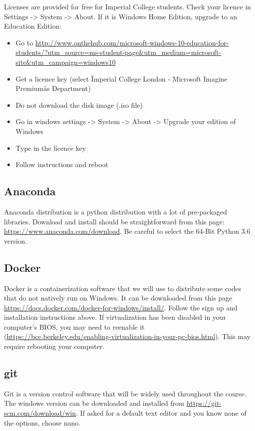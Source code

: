 \documentclass[11pt]{article}
\begin{document}
Licenses are provided for free for Imperial College students. Check your licence in Settings -> System -> About. If it is Windows Home Edition, upgrade to an Education Edition:
\begin{itemize}
  \item Go to \url{http://www.onthehub.com/microsoft-windows-10-education-for-students/?utm_source=ms-student-page&utm_medium=microsoft-site&utm_campaign=windows10}
  \item Get a licence key (select \"Imperial College London - Microsoft Imagine Premium\" as Department)
  \item Do not download the disk image (.iso file)
  \item Go in windows settings -> System -> About -> Upgrade your edition of Windows
  \item Type in the licence key
  \item Follow instructions and reboot
\end{itemize}

\subsection{Anaconda}

Anaconda distribution is a python distribution with a lot of pre-packaged libraries. 
Download and install should be straightforward from this page: \url{https://www.anaconda.com/download}. 
Be careful to select the 64-Bit Python 3.6 version.

\subsection{Docker}

Docker is a containerization software that we will use to distribute some codes that do not natively run on Windows. 
It can be downloaded from this page \url{https://docs.docker.com/docker-for-windows/install/}. 
Follow the sign up and installation instructions above. If virtualization has been disabled in your computer's BIOS, you may need to reenable it (\url{https://bce.berkeley.edu/enabling-virtualization-in-your-pc-bios.html}). This may require rebooting your computer.

\subsection{git}

Git is a version control software that will be widely used throughout the course. 
The windows version can be downloaded and installed from \url{https://git-scm.com/download/win}. 
If asked for a default text editor and you know none of the options, choose nano.
\end{document}
